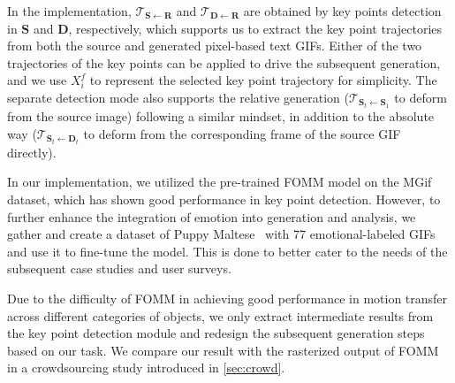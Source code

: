 In the implementation, $\mathcal{T}_{\mathbf{S}\leftarrow \mathbf{R}}$ and $\mathcal{T}_{\mathbf{D}\leftarrow \mathbf{R}}$ are obtained by key points detection in $\mathbf{S}$ and $\mathbf{D}$, respectively, which supports us to extract the key point trajectories from both the source and generated pixel-based text GIFs. Either of the two trajectories of the key points can be applied to drive the subsequent generation, and we use $X_i^f$ to represent the selected key point trajectory for simplicity. The separate detection mode also supports the relative generation ($\mathcal{T}_{\mathbf{S}_t\leftarrow \mathbf{S}_1}$ to deform from the source image) following a similar mindset, in addition to the absolute way ($\mathcal{T}_{\mathbf{S}_t\leftarrow \mathbf{D}_t}$ to deform from the corresponding frame of the source GIF directly).

In our implementation, we utilized the pre-trained FOMM model on the MGif dataset, which has shown good performance in key point detection. 
However, to further enhance the integration of emotion into generation and analysis, we gather and create a dataset of Puppy Maltese~\cite{linedog} with 77 emotional-labeled GIFs and use it to fine-tune the model. This is done to better cater to the needs of the subsequent case studies and user surveys.

Due to the difficulty of FOMM in achieving good performance in motion transfer across different categories of objects, we only extract intermediate results from the key point detection module and redesign the subsequent generation steps based on our task.
We compare our result with the rasterized output of FOMM in a crowdsourcing study introduced in \autoref{sec:crowd}.


